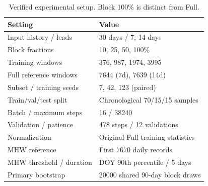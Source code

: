 \begin{table}[t]
\centering
\caption{Verified experimental setup. Block 100\% is distinct from Full.}
\label{tab:table_setup}
\small
\begin{tabular}{ll}
\toprule
Setting & Value \\
\midrule
Input history / leads & 30 days / 7, 14 days \\
Block fractions & 10, 25, 50, 100\% \\
Training windows & 376, 987, 1974, 3995 \\
Full reference windows & 7644 (7d), 7639 (14d) \\
Subset / training seeds & 7, 42, 123 (paired) \\
Train/val/test split & Chronological 70/15/15 samples \\
Batch / maximum steps & 16 / 38240 \\
Validation / patience & 478 steps / 12 validations \\
Normalization & Original Full training statistics \\
MHW reference & First 7670 daily records \\
MHW threshold / duration & DOY 90th percentile / 5 days \\
Primary bootstrap & 20000 shared 90-day block draws \\
\bottomrule
\end{tabular}
\end{table}
